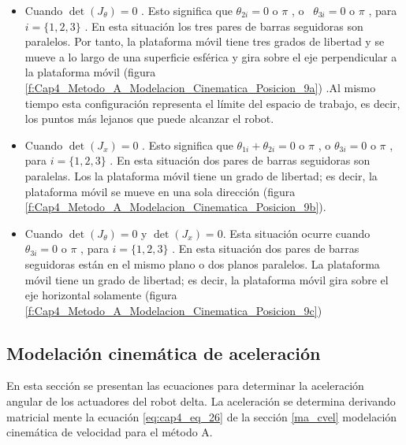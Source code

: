         \begin{itemize}
	        \item {\fontsize{10pt}{12.0pt}\selectfont Cuando  $\det  \left( J_{ \theta } \right) =0$ . Esto significa que  $\theta _{2i}=0$  o  $\pi$ , o \   $\theta _{3i}=0$ o  $\pi$  , para  \( i = \{ 1,2 ,3 \}  \) . En esta situación los tres pares de barras seguidoras son paralelos. Por tanto, la plataforma móvil tiene tres grados de libertad y se mueve a lo largo de una superficie esférica y gira sobre el eje perpendicular a la plataforma móvil (figura \ref{f:Cap4_Metodo_A_Modelacion_Cinematica_Posicion_9a}) .Al mismo tiempo esta configuración representa el límite del espacio de trabajo, es decir, los puntos más lejanos que puede alcanzar el robot. }

	        \item {\fontsize{10pt}{12.0pt}\selectfont Cuando  $\det  \left( J_{x} \right) =0 $ . Esto significa que    $ \theta _{1i}+  \theta _{2i}=0$  o  $\pi$ , o $\theta _{3i}=0$  o  $ \pi $   , para  \( i = \{ 1,2 ,3 \}  \) . En esta situación dos pares de barras seguidoras son paralelas. Los la plataforma móvil tiene un grado de libertad; es decir, la plataforma móvil se mueve en una sola dirección (figura \ref{f:Cap4_Metodo_A_Modelacion_Cinematica_Posicion_9b}).}

	        \item {\fontsize{10pt}{12.0pt}\selectfont Cuando $ \det  \left( J_{ \theta } \right) =0 $  y $ \det  \left( J_{x} \right) =0 $. Esta situación ocurre cuando  $  \theta _{3i}=0$ o  $ \pi  $  , para  \( i = \{ 1,2 ,3 \}  \) . En esta situación dos pares de barras seguidoras están en el mismo plano o dos planos paralelos. La plataforma móvil tiene un grado de libertad; es decir, la plataforma móvil gira sobre el eje horizontal solamente (figura \ref{f:Cap4_Metodo_A_Modelacion_Cinematica_Posicion_9c})}
\end{itemize}

    
    \newpage
    
    \subsection{Modelación cinemática de aceleración}\label{ma_acel}

    En esta sección se presentan las ecuaciones para determinar la aceleración angular de los actuadores del robot delta. La aceleración se determina derivando matricial mente la ecuación \ref{eq:cap4_eq_26} de la sección \ref{ma_cvel} modelación cinemática de velocidad para el método A.

